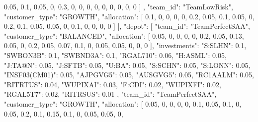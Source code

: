 {{                0.05,
                0.1,
                0.05,
                0,
                0.3,
                0,
                0,
                0,
                0,
                0,
                0,
                0,
                0,
                0
            ]
        },
        {
            "team_id": "TeamLowRisk",
            "customer_type": "GROWTH",
            "allocation": [
                0.1,
                0,
                0,
                0,
                0,
                0.2,
                0.05,
                0.1,
                0.05,
                0,
                0.2,
                0.1,
                0.05,
                0.05,
                0,
                0.1,
                0,
                0,
                0,
                0
            ]
        }
    ],
    "depot": [
        {
            "team_id": "TeamPerfectSAA",
            "customer_type": "BALANCED",
            "allocation": [
                0.05,
                0,
                0,
                0,
                0,
                0.2,
                0.05,
                0.13,
                0.05,
                0,
                0.2,
                0.05,
                0.07,
                0.1,
                0,
                0.05,
                0.05,
                0,
                0,
                0
            ],
            "investments": {
                "S:SLHN": 0.1,
                "SWBON3B": 0.1,
                "SWBND3A": 0.1,
                "RGAL710": 0.06,
                "H:ASML": 0.05,
                "J:TA@N": 0.05,
                "J:SFTB": 0.05,
                "U:BA": 0.05,
                "S:SCHN": 0.05,
                "S:LONN": 0.05,
                "INSF03(CM01)": 0.05,
                "AJPGVG5": 0.05,
                "AUSGVG5": 0.05,
                "RC1AALM": 0.05,
                "RITRTUS": 0.04,
                "WUPIXAI": 0.03,
                "F:CDI": 0.02,
                "WUPIXFI": 0.02,
                "RGAL5T7": 0.02,
                "RITRSUS": 0.01
            }
        },
        {
            "team_id": "TeamPerfectSAA",
            "customer_type": "GROWTH",
            "allocation": [
                0.05,
                0,
                0,
                0,
                0,
                0.1,
                0.05,
                0.1,
                0,
                0.05,
                0.2,
                0.1,
                0.15,
                0.1,
                0,
                0.05,
                0.05,
                0,
}}
